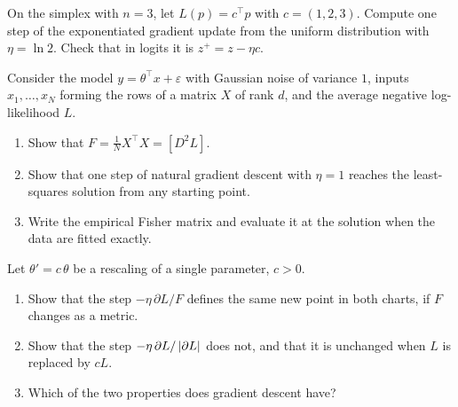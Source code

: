\begin{notechapter}
\begin{exercise}\label{natural-gradient:exr:7}
On the simplex with $n = 3$, let $L(p) = c^\top p$ with $c = (1, 2, 3)$.
Compute one step of the exponentiated gradient update from the uniform
distribution with $\eta = \ln2$. Check that in logits it is
$z^+ = z - \eta c$.
\end{exercise}

\begin{exercise}\label{natural-gradient:exr:8}
Consider the model $y = \theta^\top x + \varepsilon$ with Gaussian noise
of variance $1$, inputs $x_1,\dots,x_N$ forming the rows of a matrix $X$
of rank $d$, and the average negative log-likelihood $L$.
\begin{enumerate}[nosep]
  \item Show that $F = \frac1NX^\top X = [D^2L]$.
  \item Show that one step of natural gradient descent with $\eta = 1$
        reaches the least-squares solution from any starting point.
  \item Write the empirical Fisher matrix and evaluate it at the
        solution when the data are fitted exactly.
\end{enumerate}
\end{exercise}

\begin{exercise}\label{natural-gradient:exr:9}
Let $\theta' = c\,\theta$ be a rescaling of a single parameter, $c > 0$.
\begin{enumerate}[nosep]
  \item Show that the step $-\eta\,\partial L/F$ defines the same new
        point in both charts, if $F$ changes as a metric.
  \item Show that the step $-\eta\,\partial L/\left|\partial L\right|$ does not,
        and that it is unchanged when $L$ is replaced by $cL$.
  \item Which of the two properties does gradient descent have?
\end{enumerate}
\end{exercise}
\end{notechapter}

